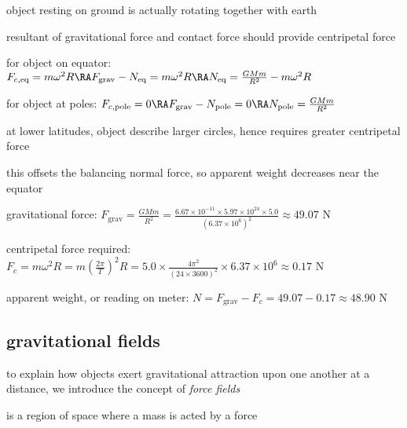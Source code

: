 object resting on ground is actually rotating together with earth

resultant of gravitational force and contact force should provide centripetal force

for object on equator: $F_{c,\text{eq}} = m\omega^2 R \RA F_\text{grav} - N_\text{eq} = m \omega^2 R  \RA N_\text{eq} = \frac{GMm}{R^2} - m \omega^2 R$

for object at poles: $F_{c,\text{pole}} = 0 \RA F_\text{grav} - N_\text{pole} = 0  \RA N_\text{pole} = \frac{GMm}{R^2}$

at lower latitudes, object describe larger circles, hence requires greater centripetal force

this offsets the balancing normal force, so apparent weight decreases near the equator


\sol gravitational force: $F_\text{grav} = \frac{GMm}{R^2} = \frac{6.67\times10^{-11}\times5.97\times10^{24}\times5.0}{(6.37\times10^6)^2} \approx 49.07 \text{ N}$

centripetal force required: $F_c = m\omega^2 R = m\left(\frac{2\pi}{T}\right)^2R = 5.0\times\frac{4\pi^2}{(24\times3600)^2}\times6.37\times10^6 \approx 0.17 \text{ N}$

apparent weight, or reading on meter: $N = F_\text{grav} - F_c = 49.07 - 0.17 \approx 48.90 \text{ N}$ \eoe




\subsection{gravitational fields}

to explain how objects exert gravitational attraction upon one another at a distance, we introduce the concept of \emph{force fields}

\begin{ilight}
	 is a region of space where a mass is acted by a force
\end{ilight}

